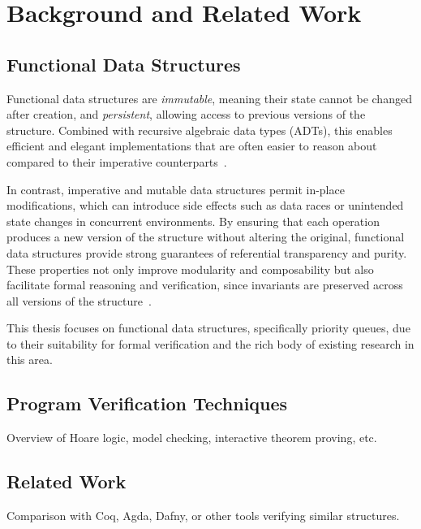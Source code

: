 \chapter { Background and Related Work }
\section { Functional Data Structures }
Functional data structures are \emph{immutable}, meaning their state cannot be changed after creation, and \emph{persistent}, allowing access to previous versions of the structure.
Combined with recursive algebraic data types (ADTs), this enables efficient and elegant implementations that are often easier to reason about compared to their imperative counterparts~\cite{okasaki}.

In contrast, imperative and mutable data structures permit in-place modifications, which can introduce side effects such as data races or unintended state changes in concurrent environments.
By ensuring that each operation produces a new version of the structure without altering the original, functional data structures provide strong guarantees of referential transparency and purity.
These properties not only improve modularity and composability but also facilitate formal reasoning and verification, since invariants are preserved across all versions of the structure~\cite{okasaki}.

This thesis focuses on functional data structures, specifically priority queues, due to their suitability for formal verification and the rich body of existing research in this area.

\section { Program Verification Techniques }
Overview of Hoare logic, model checking, interactive theorem proving, etc.

\section { Related Work }
Comparison with Coq, Agda, Dafny, or other tools verifying similar structures.
